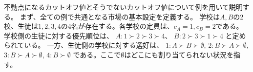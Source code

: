 \documentclass[12pt, a4paper]{article}
\theoremstyle{definition}
\theoremstyle{remark}
\theoremstyle{plain}
\begin{document}





不動点になるカットオフ値とそうでないカットオフ値について例を用いて説明する。
まず、全ての例で共通となる市場の基本設定を定義する。
学校は$A, B$の2校、生徒は$1, 2, 3, 4$の4名が存在する。各学校の定員は、$c_A=1, c_B=2$である。
学校側の生徒に対する優先順位は、
$A: 1 \succ 2 \succ 3 \succ 4$、
$B: 2 \succ 3 \succ 1 \succ 4$
と定められている。
一方、生徒側の学校に対する選好は、
$1: A \succ B \succ \emptyset$, 
$2: B \succ A \succ \emptyset$, 
$3: B \succ A \succ \emptyset$, 
$4: B \succ \emptyset$
である。ここで$\emptyset$はどこにも割り当てられない状況を指す。
\end{document}

